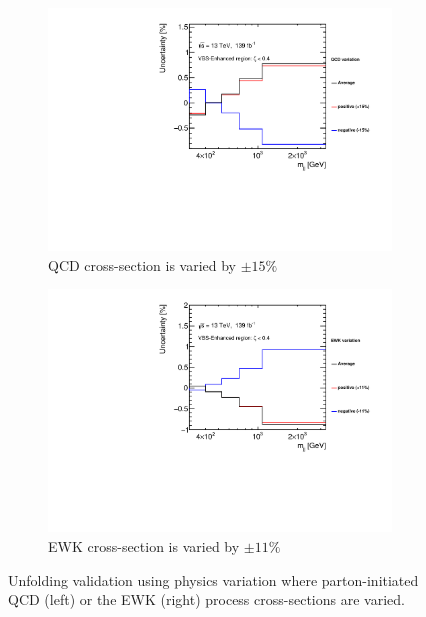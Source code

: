 \begin{figure}[htb]
    \centering
    \begin{subfigure}{.49\textwidth}
        \centering
        \includegraphics[width=.9\linewidth]{figures/Analysis/Unfolding/QCD_xsec_variation.pdf}
        \caption{ QCD cross-section is varied by $\pm  15\%$ \label{fig:unfolding_xsec_var_QCD} }
    \end{subfigure}
    \begin{subfigure}{.49\textwidth}
        \centering
        \includegraphics[width=.9\linewidth]{figures/Analysis/Unfolding/EWK_xsec_variation.pdf}
        \caption{ EWK cross-section is varied by $\pm 11\%$ \label{fig:unfolding_xsec_var_EWK}}
    \end{subfigure}
    \caption{ Unfolding validation using physics variation where parton-initiated QCD (left) or the EWK (right) process cross-sections are varied. \label{fig:unfolding_xsec_var}}
\end{figure}

